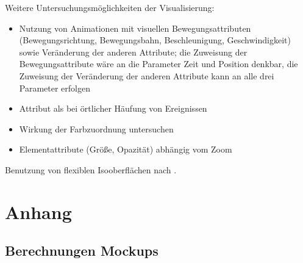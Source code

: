 Weitere Untersuchungsmöglichkeiten der Visualisierung:
\begin{itemize}
	\item Nutzung von Animationen mit visuellen Bewegungsattributen (Bewegungsrichtung, Bewegungsbahn, Beschleunigung, Geschwindigkeit) sowie Veränderung der anderen Attribute; die Zuweisung der Bewegungsattribute wäre an die Parameter Zeit und Position denkbar, die Zuweisung der Veränderung der anderen Attribute kann an alle drei Parameter erfolgen
	\item Attribut  als  bei örtlicher Häufung von Ereignissen
	\item Wirkung der Farbzuordnung untersuchen
	\item Elementattribute (Größe, Opazität) abhängig vom Zoom
\end{itemize}

Benutzung von flexiblen Isooberflächen nach \cite{carr2010flexibleIsosurfaces}.



\appendix

\chapter{Anhang}

\section{Berechnungen Mockups}\label{sec:mockups:berechnungen}

